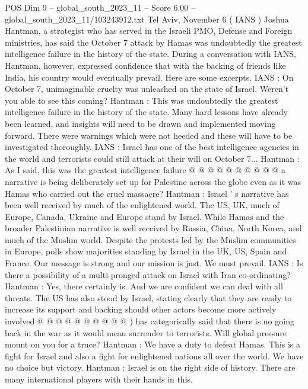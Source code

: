 \begin{textsample}{POS Dim 9 – global\_south\_2023\_11 – Score 6.00 – global\_south\_2023\_11/103243912.txt}  \label{ex:f9_pos_027}
Tel Aviv, November 6 ( IANS ) Joshua Hantman, a strategist who has served in the Israeli PMO, Defense and Foreign ministries, has said the October 7 attack by Hamas was undoubtedly the greatest intelligence failure in the history of the state.
During a conversation with IANS, Hantman, however, expressed confidence that with the backing of friends like India, his country would eventually prevail.
Here are some excerpts.
IANS : On October 7, unimaginable cruelty was unleashed on the state of Israel.
Weren't you able to see this coming?
Hantman : This was undoubtedly the greatest intelligence failure in the history of the state.
Many hard lessons have already been learned, and insights will need to be drawn and implemented moving forward.
There were warnings which were not heeded and these will have to be investigated thoroughly.
IANS : Israel has one of the best intelligence agencies in the world and terrorists could still attack at their will on October 7...
Hantman : As I said, this was the greatest intelligence failure @ @ @ @ @ @ @ @ @ @ a narrative is being deliberately set up for Palestine across the globe even as it was Hamas who carried out the cruel massacre?
Hantman : Israel ' s narrative has been well received by much of the enlightened world.
The US, UK, much of Europe, Canada, Ukraine and Europe stand by Israel.
While Hamas and the broader Palestinian narrative is well received by Russia, China, North Korea, and much of the Muslim world.
Despite the protests led by the Muslim communities in Europe, polls show majorities standing by Israel in the UK, US, Spain and France.
Our message is strong and our mission is just.
We must prevail.
IANS : Is there a possibility of a multi-pronged attack on Israel with Iran co-ordinating?
Hantman : Yes, there certainly is.
And we are confident we can deal with all threats.
The US has also stood by Israel, stating clearly that they are ready to increase its support and backing should other actors become more actively involved @ @ @ @ @ @ @ @ @ @ ) has categorically said that there is no going back in the war as it would mean surrender to terrorists.
Will global pressure mount on you for a truce?
Hantman : We have a duty to defeat Hamas.
This is a fight for Israel and also a fight for enlightened nations all over the world.
We have no choice but victory.
Hantman : Israel is on the right side of history.
There are many international players with their hands in this.

\end{textsample}
